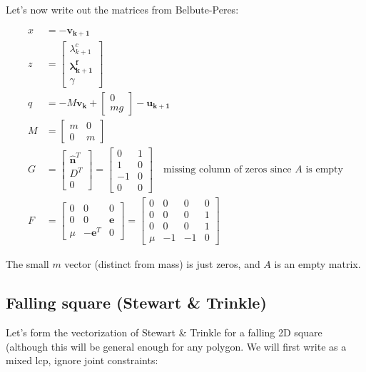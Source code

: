 \documentclass{article}
\renewcommand{\vec}[1]{\boldsymbol{#1}}
\newcommand{\rvec}[1]{\begin{bmatrix} #1 \end{bmatrix}}
\begin{document}
Let's now write out the matrices from Belbute-Peres:

\begin{align*}
    x &= -\vec{v_{k+1}} \\
    z &= \rvec{\lambda^c_{k+1} \\ \vec{\lambda^f_{k+1}} \\ \gamma} \\
    q &= - M \vec{v_k} + \rvec{0 \\ m g} - \vec{u_{k+1}} \\
    M &=
    \begin{bmatrix}
        m & 0 \\
        0 & m
    \end{bmatrix} \\
    G &= 
    \begin{bmatrix}
        \vec{\hat n}^T \\
        D^T \\
        0
    \end{bmatrix} 
    =
    \begin{bmatrix}
        0 & 1 \\
        1 & 0 \\
        -1 & 0 \\
        0 & 0
    \end{bmatrix} \quad \textrm{missing column of zeros since $A$ is empty} \\
    F &=
    \begin{bmatrix}
        0 & 0 & 0 \\
        0 & 0 & \vec{e} \\
        \mu & -\vec{e}^T & 0
    \end{bmatrix}
    =
    \begin{bmatrix}
        0 & 0 & 0 & 0 \\
        0 & 0 & 0 & 1 \\
        0 & 0 & 0 & 1 \\
        \mu & -1 & -1 & 0
    \end{bmatrix}
\end{align*}

The small $m$ vector (distinct from mass) is just zeros, and $A$ is an empty matrix.

\subsection{Falling square (Stewart \& Trinkle)}
Let's form the vectorization of Stewart \& Trinkle for a falling 2D square (although this will be general enough for any polygon. We will first write as a mixed lcp, ignore joint constraints:
\end{document}

